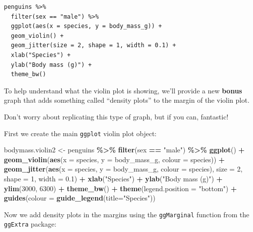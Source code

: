 \documentclass[
]{book}
\newenvironment{Shaded}{\begin{snugshade}}{\end{snugshade}}
\newcommand{\AttributeTok}[1]{\textcolor[rgb]{0.13,0.29,0.53}{#1}}
\newcommand{\DecValTok}[1]{\textcolor[rgb]{0.00,0.00,0.81}{#1}}
\newcommand{\FloatTok}[1]{\textcolor[rgb]{0.00,0.00,0.81}{#1}}
\newcommand{\FunctionTok}[1]{\textcolor[rgb]{0.13,0.29,0.53}{\textbf{#1}}}
\newcommand{\NormalTok}[1]{#1}
\newcommand{\OtherTok}[1]{\textcolor[rgb]{0.56,0.35,0.01}{#1}}
\newcommand{\SpecialCharTok}[1]{\textcolor[rgb]{0.81,0.36,0.00}{\textbf{#1}}}
\newcommand{\StringTok}[1]{\textcolor[rgb]{0.31,0.60,0.02}{#1}}
\begin{document}
\begin{verbatim}
penguins %>% 
  filter(sex == "male") %>%
  ggplot(aes(x = species, y = body_mass_g)) +
  geom_violin() +
  geom_jitter(size = 2, shape = 1, width = 0.1) +
  xlab("Species") +
  ylab("Body mass (g)") +
  theme_bw()
\end{verbatim}

To help understand what the violin plot is showing, we'll provide a new \textbf{bonus} graph that adds something called ``density plots'' to the margin of the violin plot.

Don't worry about replicating this type of graph, but if you can, fantastic!

First we create the main \texttt{ggplot} violin plot object:

\begin{Shaded}
\begin{Highlighting}[]
\NormalTok{bodymass.violin2 }\OtherTok{\textless{}{-}}\NormalTok{ penguins }\SpecialCharTok{\%\textgreater{}\%} 
  \FunctionTok{filter}\NormalTok{(sex }\SpecialCharTok{==} \StringTok{"male"}\NormalTok{) }\SpecialCharTok{\%\textgreater{}\%}
  \FunctionTok{ggplot}\NormalTok{() }\SpecialCharTok{+}
  \FunctionTok{geom\_violin}\NormalTok{(}\FunctionTok{aes}\NormalTok{(}\AttributeTok{x =}\NormalTok{ species, }\AttributeTok{y =}\NormalTok{ body\_mass\_g, }\AttributeTok{colour =}\NormalTok{ species)) }\SpecialCharTok{+}
  \FunctionTok{geom\_jitter}\NormalTok{(}\FunctionTok{aes}\NormalTok{(}\AttributeTok{x =}\NormalTok{ species, }\AttributeTok{y =}\NormalTok{ body\_mass\_g, }\AttributeTok{colour =}\NormalTok{ species), }\AttributeTok{size =} \DecValTok{2}\NormalTok{, }\AttributeTok{shape =} \DecValTok{1}\NormalTok{, }\AttributeTok{width =} \FloatTok{0.1}\NormalTok{) }\SpecialCharTok{+}
  \FunctionTok{xlab}\NormalTok{(}\StringTok{"Species"}\NormalTok{) }\SpecialCharTok{+}
  \FunctionTok{ylab}\NormalTok{(}\StringTok{"Body mass (g)"}\NormalTok{) }\SpecialCharTok{+}
  \FunctionTok{ylim}\NormalTok{(}\DecValTok{3000}\NormalTok{, }\DecValTok{6300}\NormalTok{) }\SpecialCharTok{+}
  \FunctionTok{theme\_bw}\NormalTok{() }\SpecialCharTok{+}
  \FunctionTok{theme}\NormalTok{(}\AttributeTok{legend.position =} \StringTok{"bottom"}\NormalTok{) }\SpecialCharTok{+}
  \FunctionTok{guides}\NormalTok{(}\AttributeTok{colour =} \FunctionTok{guide\_legend}\NormalTok{(}\AttributeTok{title=}\StringTok{"Species"}\NormalTok{))}
\end{Highlighting}
\end{Shaded}

Now we add density plots in the margins using the \texttt{ggMarginal} function from the \texttt{ggExtra} package:
\end{document}

